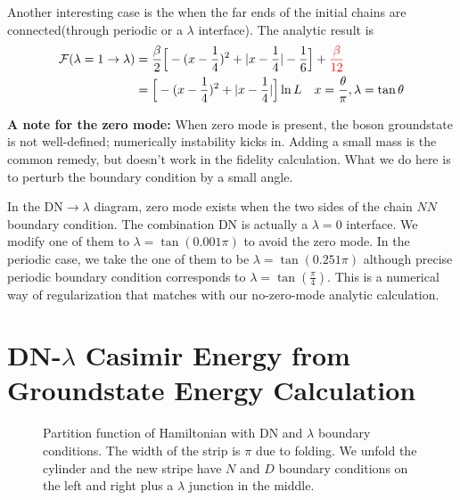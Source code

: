 \documentclass{article}
\begin{document}
Another interesting case is the when the far ends of the initial chains are connected(through periodic or a $\lambda$ interface). The analytic result is
\begin{equation}
\begin{aligned}
  \mathcal{F}( \lambda = 1 \rightarrow \lambda ) &=  \frac{\beta}{2}\Big[  -( x - \frac{1}{4} )^2  + | x - \frac{1}{4} | - \frac{1}{6} \Big]  + {\color{red} \frac{\beta}{12}} \\
  &= \Big[  -( x - \frac{1}{4} )^2  + | x - \frac{1}{4} | \Big]  \ln L \quad x = \frac{\theta}{\pi}, \lambda = \tan \theta 
\end{aligned}
\end{equation}

{\bf A note for the zero mode:} When zero mode is present, the boson groundstate is not well-defined; numerically instability kicks in. Adding a small mass is the common remedy, but doesn't work in the fidelity calculation. What we do here is to perturb the boundary condition by a small angle.

In the DN$\rightarrow \lambda$ diagram, zero mode exists when the two sides of the chain $NN$ boundary condition. The combination DN is actually a $\lambda = 0$ interface. We modify one of them to $\lambda = \tan( 0.001 \pi )$ to avoid the zero mode. In the periodic case, we take the one of them to be $\lambda = \tan(0.251\pi)$ although precise periodic boundary condition corresponds to $\lambda = \tan(\frac{\pi}{4})$. This is a numerical way of regularization that matches with our no-zero-mode analytic calculation. 




\appendix


\section{DN-$\lambda$ Casimir Energy from Groundstate Energy Calculation}
\label{app:gnd_dn_lambda}


\begin{figure}[h]
\centering
{}
\caption{Partition function of Hamiltonian with DN and $\lambda$ boundary conditions. The width of the strip is $\pi$ due to folding. We unfold the cylinder and the new stripe have $N$ and $D$ boundary conditions on the left and right plus a $\lambda$ junction in the middle. }
\label{fig:DN-lambda-gnd}
\end{figure}
\end{document}
